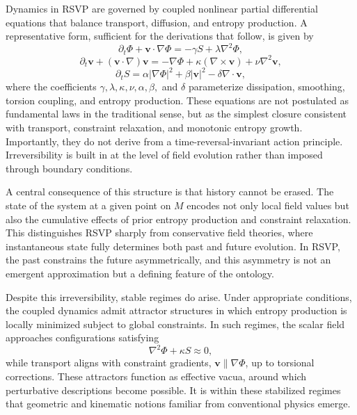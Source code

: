 \documentclass[11pt]{article}
\begin{document}
Dynamics in RSVP are governed by coupled nonlinear partial differential equations that balance transport, diffusion, and entropy production. A representative form, sufficient for the derivations that follow, is given by
\begin{equation}
\partial_t \Phi + \mathbf{v} \cdot \nabla \Phi = -\gamma S + \lambda \nabla^2 \Phi,
\end{equation}
\begin{equation}
\partial_t \mathbf{v} + (\mathbf{v} \cdot \nabla)\mathbf{v} = -\nabla \Phi + \kappa (\nabla \times \mathbf{v}) + \nu \nabla^2 \mathbf{v},
\end{equation}
\begin{equation}
\partial_t S = \alpha \lvert \nabla \Phi \rvert^2 + \beta \lvert \mathbf{v} \rvert^2 - \delta \nabla \cdot \mathbf{v},
\end{equation}
where the coefficients $\gamma, \lambda, \kappa, \nu, \alpha, \beta,$ and $\delta$ parameterize dissipation, smoothing, torsion coupling, and entropy production. These equations are not postulated as fundamental laws in the traditional sense, but as the simplest closure consistent with transport, constraint relaxation, and monotonic entropy growth. Importantly, they do not derive from a time-reversal-invariant action principle. Irreversibility is built in at the level of field evolution rather than imposed through boundary conditions.

A central consequence of this structure is that history cannot be erased. The state of the system at a given point on $M$ encodes not only local field values but also the cumulative effects of prior entropy production and constraint relaxation. This distinguishes RSVP sharply from conservative field theories, where instantaneous state fully determines both past and future evolution. In RSVP, the past constrains the future asymmetrically, and this asymmetry is not an emergent approximation but a defining feature of the ontology.

Despite this irreversibility, stable regimes do arise. Under appropriate conditions, the coupled dynamics admit attractor structures in which entropy production is locally minimized subject to global constraints. In such regimes, the scalar field approaches configurations satisfying
\begin{equation}
\nabla^2 \Phi + \kappa S \approx 0,
\end{equation}
while transport aligns with constraint gradients, $\mathbf{v} \parallel \nabla \Phi$, up to torsional corrections. These attractors function as effective vacua, around which perturbative descriptions become possible. It is within these stabilized regimes that geometric and kinematic notions familiar from conventional physics emerge.
\end{document}
